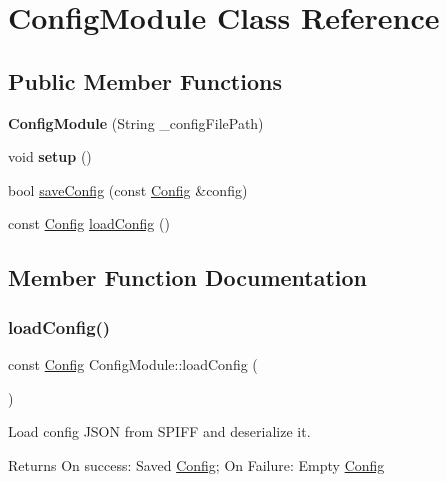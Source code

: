 \hypertarget{class_config_module}{}\section{Config\+Module Class Reference}
\label{class_config_module}
\subsection*{Public Member Functions}
\begin{DoxyCompactItemize}
\item 
\mbox{\label{class_config_module_a0f7c95e0a768a56c7f4ff835b09657b2}} 
{\bfseries Config\+Module} (String \+\_\+config\+File\+Path)
\item 
\mbox{\label{class_config_module_a3ab8220b02e11fdb12af8111ef77c6ac}} 
void {\bfseries setup} ()
\item 
bool \mbox{\hyperlink{class_config_module_ab7b7cb9aba4ab90bec664eef2b4a00f3}{save\+Config}} (const \mbox{\hyperlink{struct_config}{Config}} \&config)
\item 
const \mbox{\hyperlink{struct_config}{Config}} \mbox{\hyperlink{class_config_module_a1a9cda5559839cac0f4444d6352e9067}{load\+Config}} ()
\end{DoxyCompactItemize}


\subsection{Member Function Documentation}
\mbox{\label{class_config_module_a1a9cda5559839cac0f4444d6352e9067}} 
\subsubsection{\texorpdfstring{loadConfig()}{loadConfig()}}
{\footnotesize\ttfamily const \mbox{\hyperlink{struct_config}{Config}} Config\+Module\+::load\+Config (\begin{DoxyParamCaption}{ }\end{DoxyParamCaption})}

Load config J\+S\+ON from S\+P\+I\+FF and deserialize it. \begin{DoxyReturn}{Returns}
On success\+: Saved \mbox{\hyperlink{struct_config}{Config}}; On Failure\+: Empty \mbox{\hyperlink{struct_config}{Config}} 
\end{DoxyReturn}
\mbox{\label{class_config_module_ab7b7cb9aba4ab90bec664eef2b4a00f3}} 
